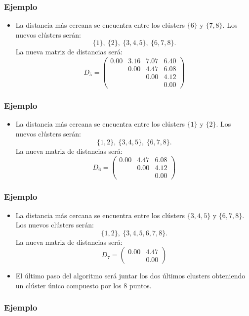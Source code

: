 \begin{frame}
\frametitle{Ejemplo}
\begin{itemize}
\item<2->{La distancia más cercana se encuentra entre los clústers $\{6\}$ y $\{7,8\}$. Los nuevos clústers serán:
$$
\{1\},\ \{2\},\ \{3,4,5\},\ \{6,7,8\}.
$$
La nueva matriz de distancias será:
$$
D_5= \begin{pmatrix}
0.00&3.16&7.07&6.40\\
&0.00&4.47&6.08\\
&&0.00&4.12\\
&&&0.00
\end{pmatrix}
$$}
\end{itemize}
\end{frame}
\begin{frame}
\frametitle{Ejemplo}
\begin{itemize}
\item<2->{La distancia más cercana se encuentra entre los clústers $\{1\}$ y $\{2\}$. Los nuevos clústers serán:
$$
\{1,2\},\ \{3,4,5\},\ \{6,7,8\}.
$$
La nueva matriz de distancias será:
$$
D_6 = \begin{pmatrix}
0.00 & 4.47 & 6.08\\
& 0.00 & 4.12\\
&&0.00
\end{pmatrix}
$$}
\end{itemize}
\end{frame}
\begin{frame}
\frametitle{Ejemplo}
\begin{itemize}
\item<2->{La distancia más cercana se encuentra entre los clústers $\{3,4,5\}$ y $\{6,7,8\}$. Los nuevos clústers serán:
$$
\{1,2\},\ \{3,4,5,6,7,8\}.
$$
La nueva matriz de distancias será:
$$
D_7 = \begin{pmatrix}
0.00 & 4.47\\
&0.00
\end{pmatrix}
$$}
\item<3->{El último paso del algoritmo será juntar los dos últimos clusters obteniendo un clúster único compuesto por los $8$ puntos.}
\end{itemize}
\end{frame}
\begin{frame}
\frametitle{Ejemplo}
\uncover<2->{Todo el ejemplo queda resumido en lo que se denomina un dendograma:
\vskip 0.05cm
\texttt{[image: DendogramaPuntsSimple.pdf]}}
\end{frame}
